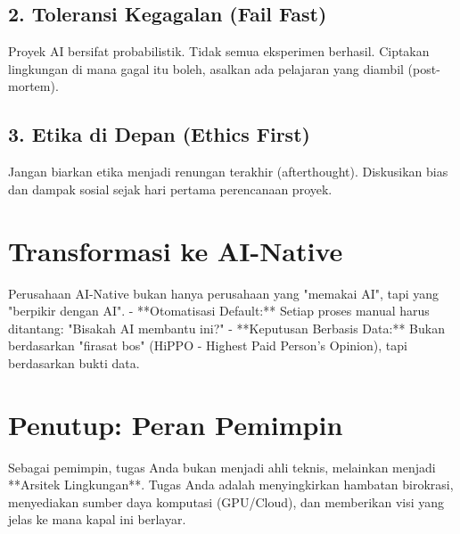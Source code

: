 \subsection{2. Toleransi Kegagalan (Fail Fast)}
Proyek AI bersifat probabilistik. Tidak semua eksperimen berhasil. Ciptakan lingkungan di mana gagal itu boleh, asalkan ada pelajaran yang diambil (post-mortem).

\subsection{3. Etika di Depan (Ethics First)}
Jangan biarkan etika menjadi renungan terakhir (afterthought). Diskusikan bias dan dampak sosial sejak hari pertama perencanaan proyek.

\section{Transformasi ke AI-Native}

Perusahaan AI-Native bukan hanya perusahaan yang "memakai AI", tapi yang "berpikir dengan AI".
- **Otomatisasi Default:** Setiap proses manual harus ditantang: "Bisakah AI membantu ini?"
- **Keputusan Berbasis Data:** Bukan berdasarkan "firasat bos" (HiPPO - Highest Paid Person's Opinion), tapi berdasarkan bukti data.

\section{Penutup: Peran Pemimpin}

Sebagai pemimpin, tugas Anda bukan menjadi ahli teknis, melainkan menjadi **Arsitek Lingkungan**. Tugas Anda adalah menyingkirkan hambatan birokrasi, menyediakan sumber daya komputasi (GPU/Cloud), dan memberikan visi yang jelas ke mana kapal ini berlayar.
